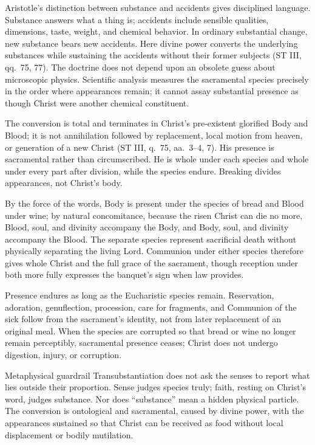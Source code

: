 Aristotle's distinction between substance and accidents gives disciplined language. Substance answers what a thing is; accidents include sensible qualities, dimensions, taste, weight, and chemical behavior. In ordinary substantial change, new substance bears new accidents. Here divine power converts the underlying substances while sustaining the accidents without their former subjects (ST III, qq.~75, 77). The doctrine does not depend upon an obsolete guess about microscopic physics. Scientific analysis measures the sacramental species precisely in the order where appearances remain; it cannot assay substantial presence as though Christ were another chemical constituent.

The conversion is total and terminates in Christ's pre-existent glorified Body and Blood; it is not annihilation followed by replacement, local motion from heaven, or generation of a new Christ (ST III, q.~75, aa.~3--4, 7). His presence is sacramental rather than circumscribed. He is whole under each species and whole under every part after division, while the species endure. Breaking divides appearances, not Christ's body.

By the force of the words, Body is present under the species of bread and Blood under wine; by natural concomitance, because the risen Christ can die no more, Blood, soul, and divinity accompany the Body, and Body, soul, and divinity accompany the Blood. The separate species represent sacrificial death without physically separating the living Lord. Communion under either species therefore gives whole Christ and the full grace of the sacrament, though reception under both more fully expresses the banquet's sign when law provides.

Presence endures as long as the Eucharistic species remain. Reservation, adoration, genuflection, procession, care for fragments, and Communion of the sick follow from the sacrament's identity, not from later replacement of an original meal. When the species are corrupted so that bread or wine no longer remain perceptibly, sacramental presence ceases; Christ does not undergo digestion, injury, or corruption.

\begin{studybox}{Metaphysical guardrail}
Transubstantiation does not ask the senses to report what lies outside their proportion. Sense judges species truly; faith, resting on Christ's word, judges substance. Nor does ``substance'' mean a hidden physical particle. The conversion is ontological and sacramental, caused by divine power, with the appearances sustained so that Christ can be received as food without local displacement or bodily mutilation.
\end{studybox}

